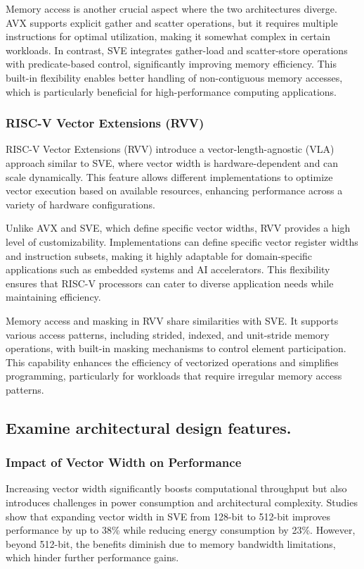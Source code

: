 \documentclass[conference]{IEEEtran}
\begin{document}
Memory access is another crucial aspect where the two architectures diverge. AVX supports explicit gather and scatter operations, but it requires multiple instructions for optimal utilization, making it somewhat complex in certain workloads\cite{b12}. In contrast, SVE integrates gather-load and scatter-store operations with predicate-based control, significantly improving memory efficiency\cite{b16}. This built-in flexibility enables better handling of non-contiguous memory accesses, which is particularly beneficial for high-performance computing applications.

\subsubsection{RISC-V Vector Extensions (RVV)}

RISC-V Vector Extensions (RVV) introduce a vector-length-agnostic (VLA) approach similar to SVE, where vector width is hardware-dependent and can scale dynamically\cite{b17}. This feature allows different implementations to optimize vector execution based on available resources, enhancing performance across a variety of hardware configurations.

Unlike AVX and SVE, which define specific vector widths, RVV provides a high level of customizability. Implementations can define specific vector register widths and instruction subsets, making it highly adaptable for domain-specific applications such as embedded systems and AI accelerators\cite{b17}. This flexibility ensures that RISC-V processors can cater to diverse application needs while maintaining efficiency.

Memory access and masking in RVV share similarities with SVE. It supports various access patterns, including strided, indexed, and unit-stride memory operations, with built-in masking mechanisms to control element participation\cite{b17}. This capability enhances the efficiency of vectorized operations and simplifies programming, particularly for workloads that require irregular memory access patterns.
\subsection{Examine architectural design features.}
\subsubsection{Impact of Vector Width on Performance}

Increasing vector width significantly boosts computational throughput but also introduces challenges in power consumption and architectural complexity. Studies show that expanding vector width in SVE from 128-bit to 512-bit improves performance by up to 38\% while reducing energy consumption by 23\%\cite{b15}. However, beyond 512-bit, the benefits diminish due to memory bandwidth limitations, which hinder further performance gains\cite{b16}.
\end{document}

